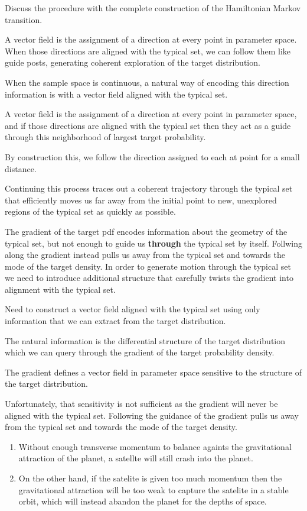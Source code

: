 \documentclass[
]{book}
\providecommand{\tightlist}{%
  \setlength{\itemsep}{0pt}\setlength{\parskip}{0pt}}
\begin{document}
Discuss the procedure with the complete construction of the Hamiltonian Markov transition.

A vector field is the assignment of a direction at every point in parameter space. When those directions are aligned with the typical set, we can follow them like guide posts, generating coherent exploration of the target distribution.

When the sample space is continuous, a natural way of encoding this direction information is with a vector field aligned with the typical set.

A vector field is the assignment of a direction at every point in parameter space, and if those directions are aligned with the typical set then they act as a guide through this neighborhood of largest target probability.

By construction this, we follow the direction assigned to each at point for a small distance.

Continuing this process traces out a coherent trajectory through the typical set that efficiently moves us far away from the initial point to new, unexplored regions of the typical set as quickly as possible.

The gradient of the target pdf encodes information about the geometry of the typical set, but not enough to guide us \textbf{through} the typical set by itself. Follwing along the gradient instead pulls us away from the typical set and towards the mode of the target density. In order to generate motion through the typical set we need to introduce additional structure that carefully twists the gradient into alignment with the typical set.

Need to construct a vector field aligned with the typical set using only information that we can extract from the target distribution.

The natural information is the differential structure of the target distribution which we can query through the gradient of the target probability density.

The gradient defines a vector field in parameter space sensitive to the structure of the target distribution.

Unfortunately, that sensitivity is not sufficient as the gradient will never be aligned with the typical set. Following the guidance of the gradient pulls us away from the typical set and towards the mode of the target density.

\begin{enumerate}
\def\labelenumi{(\alph{enumi})}
\tightlist
\item
  Without enough transverse momentum to balance againts the gravitational attraction of the planet, a satellte will still crash into the planet.
\item
  On the other hand, if the satelite is given too much momentum then the gravitational attraction will be too weak to capture the satelite in a stable orbit, which will instead abandon the planet for the depths of space.
\end{enumerate}
\end{document}
